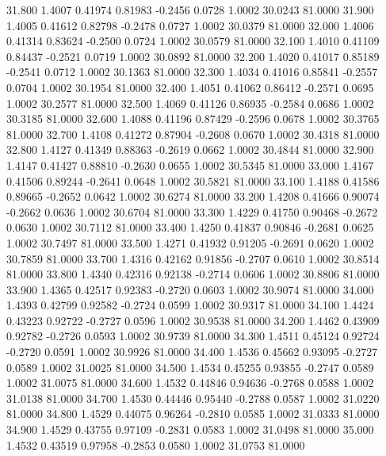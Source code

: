   31.800   1.4007   0.41974   0.81983  -0.2456   0.0728   1.0002  30.0243  81.0000
  31.900   1.4005   0.41612   0.82798  -0.2478   0.0727   1.0002  30.0379  81.0000
  32.000   1.4006   0.41314   0.83624  -0.2500   0.0724   1.0002  30.0579  81.0000
  32.100   1.4010   0.41109   0.84437  -0.2521   0.0719   1.0002  30.0892  81.0000
  32.200   1.4020   0.41017   0.85189  -0.2541   0.0712   1.0002  30.1363  81.0000
  32.300   1.4034   0.41016   0.85841  -0.2557   0.0704   1.0002  30.1954  81.0000
  32.400   1.4051   0.41062   0.86412  -0.2571   0.0695   1.0002  30.2577  81.0000
  32.500   1.4069   0.41126   0.86935  -0.2584   0.0686   1.0002  30.3185  81.0000
  32.600   1.4088   0.41196   0.87429  -0.2596   0.0678   1.0002  30.3765  81.0000
  32.700   1.4108   0.41272   0.87904  -0.2608   0.0670   1.0002  30.4318  81.0000
  32.800   1.4127   0.41349   0.88363  -0.2619   0.0662   1.0002  30.4844  81.0000
  32.900   1.4147   0.41427   0.88810  -0.2630   0.0655   1.0002  30.5345  81.0000
  33.000   1.4167   0.41506   0.89244  -0.2641   0.0648   1.0002  30.5821  81.0000
  33.100   1.4188   0.41586   0.89665  -0.2652   0.0642   1.0002  30.6274  81.0000
  33.200   1.4208   0.41666   0.90074  -0.2662   0.0636   1.0002  30.6704  81.0000
  33.300   1.4229   0.41750   0.90468  -0.2672   0.0630   1.0002  30.7112  81.0000
  33.400   1.4250   0.41837   0.90846  -0.2681   0.0625   1.0002  30.7497  81.0000
  33.500   1.4271   0.41932   0.91205  -0.2691   0.0620   1.0002  30.7859  81.0000
  33.700   1.4316   0.42162   0.91856  -0.2707   0.0610   1.0002  30.8514  81.0000
  33.800   1.4340   0.42316   0.92138  -0.2714   0.0606   1.0002  30.8806  81.0000
  33.900   1.4365   0.42517   0.92383  -0.2720   0.0603   1.0002  30.9074  81.0000
  34.000   1.4393   0.42799   0.92582  -0.2724   0.0599   1.0002  30.9317  81.0000
  34.100   1.4424   0.43223   0.92722  -0.2727   0.0596   1.0002  30.9538  81.0000
  34.200   1.4462   0.43909   0.92782  -0.2726   0.0593   1.0002  30.9739  81.0000
  34.300   1.4511   0.45124   0.92724  -0.2720   0.0591   1.0002  30.9926  81.0000
  34.400   1.4536   0.45662   0.93095  -0.2727   0.0589   1.0002  31.0025  81.0000
  34.500   1.4534   0.45255   0.93855  -0.2747   0.0589   1.0002  31.0075  81.0000
  34.600   1.4532   0.44846   0.94636  -0.2768   0.0588   1.0002  31.0138  81.0000
  34.700   1.4530   0.44446   0.95440  -0.2788   0.0587   1.0002  31.0220  81.0000
  34.800   1.4529   0.44075   0.96264  -0.2810   0.0585   1.0002  31.0333  81.0000
  34.900   1.4529   0.43755   0.97109  -0.2831   0.0583   1.0002  31.0498  81.0000
  35.000   1.4532   0.43519   0.97958  -0.2853   0.0580   1.0002  31.0753  81.0000

